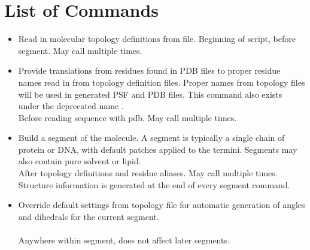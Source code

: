\section{List of Commands}

\begin{itemize}

\item {}
{Read in molecular topology definitions from file.}
{}
{Beginning of script, before segment.  May call multiple times.}

\item {}
{Provide translations from residues found in PDB files to proper
residue names read in from topology definition files.  Proper names
from topology files will be used in generated PSF and PDB files.
This command also exists under the deprecated name .}
{\\
}
{Before reading sequence with pdb.  May call multiple times.}

\item {}
{Build a segment of the molecule.  A segment is typically a single
chain of protein or DNA, with default patches applied to the termini.
Segments may also contain pure solvent or lipid.}
{\\
}
{After topology definitions and residue aliases.  May call multiple times.
Structure information is generated at the end of every segment command.}

\item {}
{Override default settings from topology file for automatic generation of
angles and dihedrals for the current segment.}
{\\
\\
}
{Anywhere within segment, does not affect later segments.}


\end{itemize}

